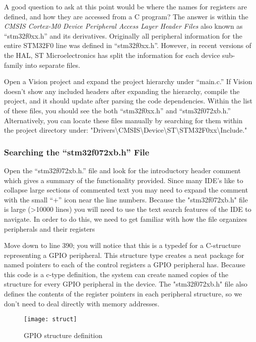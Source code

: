 \documentclass[11pt,fleqn]{book} %
\begin{document}
A good question to ask at this point would be where the names for registers are defined, and how they are accessed from a C program? The answer is within the \textit{CMSIS Cortex-M0 Device Peripheral Access Layer Header Files} also known as ``stm32f0xx.h'' and its derivatives. Originally all peripheral information for the entire STM32F0 line was defined in ``stm32f0xx.h''. However, in recent versions of the HAL, ST Microelectronics has split the information for each device sub-family into separate files. 

Open a {\textmu}Vision project and expand the project hierarchy under ``main.c.'' If {\textmu}Vision doesn't show any included headers after expanding the hierarchy, compile the project, and it should update after parsing the code dependencies. Within the list of these files, you should see the both ``stm32f0xx.h'' and ``stm32f072xb.h.''  Alternatively, you can locate these files manually by searching for them within the project directory under: "Drivers\textbackslash CMSIS\textbackslash Device\textbackslash ST\textbackslash STM32F0xx\textbackslash Include." 

\subsubsection{Searching the ``stm32f072xb.h'' File}

Open the ``stm32f072xb.h.'' file and look for the introductory header comment which gives a summary of the functionality provided. Since many IDE's like to collapse large sections of commented text you may need to expand the comment with the small ``+'' icon near the line numbers. Because the "stm32f072xb.h" file is large (>10000 lines) you will need to use the text search features of the IDE to navigate. In order to do this, we need to get familiar with how the file organizes peripherals and their registers

Move down to line 390; you will notice that this is a typedef for a C-structure representing a GPIO peripheral. This structure type creates a neat package for named pointers to each of the control registers a GPIO peripheral has. Because this code is a c-type definition, the system can create named copies of the structure for every GPIO peripheral in the device. The "stm32f072xb.h" file also defines the contents of the register pointers in each peripheral structure, so we don't need to deal directly with memory addresses.

\begin{figure}[]
    \centering\texttt{[image: struct]}
    \caption{GPIO structure definition}
    \label{struct}
\end{figure}
\end{document}

